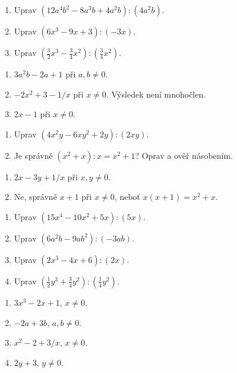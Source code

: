 \documentclass[11pt,a4paper]{article}
\begin{document}

\begin{zadaniReseniBox}[title={Základ: rozděl celý čitatel},breakable=false]
\begin{enumerate}[label=\alph*)]
\item Uprav $(12a^4b^2-8a^3b+4a^2b):(4a^2b)$.
\item Uprav $(6x^3-9x+3):(-3x)$.
\item Uprav $(\frac32x^3-\frac34x^2):(\frac34x^2)$.
\end{enumerate}
\tcblower
\begin{enumerate}[label=\alph*)]
\item $3a^2b-2a+1$ při $a,b\ne0$.
\item $-2x^2+3-1/x$ při $x\ne0$. Výsledek není mnohočlen.
\item $2x-1$ při $x\ne0$.
\end{enumerate}
\end{zadaniReseniBox}

\begin{zadaniReseniBox}[title={Rezerva: dvě proměnné a zlomek ve výsledku},breakable=false]
\begin{enumerate}[label=\alph*)]
\item Uprav $(4x^2y-6xy^2+2y):(2xy)$.
\item Je správně $(x^2+x):x=x^2+1$? Oprav a ověř násobením.
\end{enumerate}
\tcblower
\begin{enumerate}[label=\alph*)]
\item $2x-3y+1/x$ při $x,y\ne0$.
\item Ne, správně $x+1$ při $x\ne0$, neboť $x(x+1)=x^2+x$.
\end{enumerate}
\end{zadaniReseniBox}




\begin{zadaniReseniBox}[title={Domácí úlohy},breakable=false]
\begin{enumerate}[label=\alph*)]
\item Uprav $(15x^4-10x^2+5x):(5x)$.
\item Uprav $(6a^2b-9ab^2):(-3ab)$.
\item Uprav $(2x^3-4x+6):(2x)$.
\item Uprav $(\frac12y^3+\frac34y^2):(\frac14y^2)$.
\end{enumerate}
\tcblower
\begin{enumerate}[label=\alph*)]
\item $3x^3-2x+1$, $x\ne0$.
\item $-2a+3b$, $a,b\ne0$.
\item $x^2-2+3/x$, $x\ne0$.
\item $2y+3$, $y\ne0$.
\end{enumerate}
\end{zadaniReseniBox}
\end{document}
